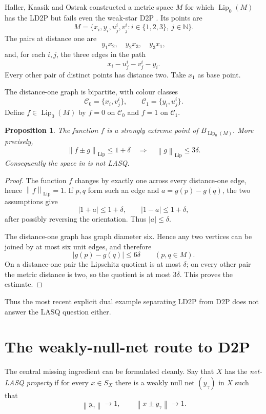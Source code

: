 \documentclass[11pt]{article}
\newtheorem{proposition}[theorem]{Proposition}
\newcommand{\N}{\mathbb N}
\newcommand{\Lip}{\operatorname{Lip}}
\newcommand{\norm}[1]{\left\lVert #1\right\rVert}
\newcommand{\abs}[1]{\left\lvert #1\right\rvert}
\begin{document}
Haller, Kaasik and Ostrak constructed a metric space $M$ for which $\Lip_0(M)$ has the LD2P but fails even the weak-star D2P \cite[Example~5.2]{HallerKaasikOstrak2026}.  Its points are
\[
 M=\{x_i,y_i,u_j^i,v_j^i:i\in\{1,2,3\},\ j\in\N\}.
\]
The pairs at distance one are
\[
 y_1x_2,\quad y_2x_3,\quad y_3x_1,
\]
and, for each $i,j$, the three edges in the path
\[
 x_i-u_j^i-v_j^i-y_i.
\]
Every other pair of distinct points has distance two.  Take $x_1$ as base point.

The distance-one graph is bipartite, with colour classes
\[
 \mathcal C_0=\{x_i,v_j^i\},
 \qquad
 \mathcal C_1=\{y_i,u_j^i\}.
\]
Define $f\in\Lip_0(M)$ by $f=0$ on $\mathcal C_0$ and $f=1$ on $\mathcal C_1$.

\begin{proposition}
\label{prop:lip-strong}
The function $f$ is a strongly extreme point of $B_{\Lip_0(M)}$.  More precisely,
\[
 \norm{f\pm g}_{\Lip}\le1+\delta
 \quad\Longrightarrow\quad
 \norm{g}_{\Lip}\le3\delta.
\]
Consequently the space in \cite[Example~5.2]{HallerKaasikOstrak2026} is not LASQ.
\end{proposition}

\begin{proof}
The function $f$ changes by exactly one across every distance-one edge, hence $\norm{f}_{\Lip}=1$.  If $p,q$ form such an edge and $a=g(p)-g(q)$, the two assumptions give
\[
 \abs{1+a}\le1+\delta,
 \qquad
 \abs{1-a}\le1+\delta,
\]
after possibly reversing the orientation.  Thus $\abs{a}\le\delta$.

The distance-one graph has graph diameter six.  Hence any two vertices can be joined by at most six unit edges, and therefore
\[
 \abs{g(p)-g(q)}\le6\delta
 \qquad(p,q\in M).
\]
On a distance-one pair the Lipschitz quotient is at most $\delta$; on every other pair the metric distance is two, so the quotient is at most $3\delta$.  This proves the estimate.
\end{proof}

Thus the most recent explicit dual example separating LD2P from D2P does not answer the LASQ question either.

\section{The weakly-null-net route to D2P}
\label{sec:net}

The central missing ingredient can be formulated cleanly.  Say that $X$ has the \emph{net-LASQ property} if for every $x\in S_X$ there is a weakly null net $(y_\gamma)$ in $X$ such that
\[
 \norm{y_\gamma}\to1,
 \qquad
 \norm{x\pm y_\gamma}\to1.
\]
\end{document}
